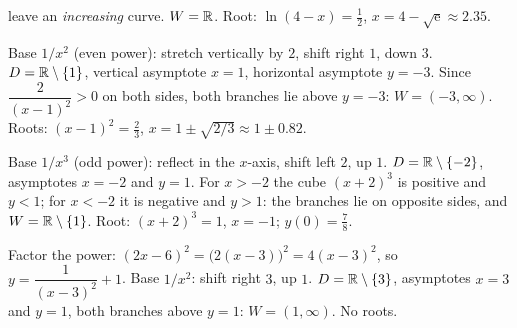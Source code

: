 \begin{solutions}
        leave an \emph{increasing} curve. $W=\mathbb{R}$. Root: $\ln(4-x)=\tfrac12$,
        $x=4-\sqrt{\mathrm{e}}\approx2.35$.
  \item Base $1/x^{2}$ (even power): stretch vertically by $2$, shift
        right $1$, down $3$. $D=\mathbb{R}\setminus\{1\}$, vertical asymptote $x=1$,
        horizontal asymptote $y=-3$. Since $\dfrac{2}{(x-1)^{2}}>0$ on both
        sides, both branches lie above $y=-3$: $W=(-3,\infty)$. Roots:
        $(x-1)^{2}=\tfrac23$, $x=1\pm\sqrt{2/3}\approx1\pm0.82$.
  \item Base $1/x^{3}$ (odd power): reflect in the $x$-axis, shift left
        $2$, up $1$. $D=\mathbb{R}\setminus\{-2\}$, asymptotes $x=-2$ and $y=1$.
        For $x>-2$ the cube $(x+2)^{3}$ is positive and $y<1$; for $x<-2$
        it is negative and $y>1$: the branches lie on opposite sides, and
        $W=\mathbb{R}\setminus\{1\}$. Root: $(x+2)^{3}=1$, $x=-1$; $y(0)=\tfrac78$.
  \item Factor the power: $(2x-6)^{2}=\bigl(2(x-3)\bigr)^{2}=4(x-3)^{2}$,
        so $y=\dfrac{1}{(x-3)^{2}}+1$. Base $1/x^{2}$: shift right $3$, up
        $1$. $D=\mathbb{R}\setminus\{3\}$, asymptotes $x=3$ and $y=1$, both branches
        above $y=1$: $W=(1,\infty)$. No roots.
\end{solutions}
